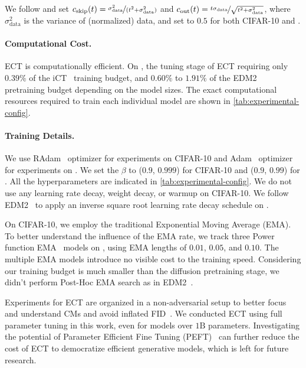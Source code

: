 We follow \citep{Karras2022edm,cm} and set $c_{\text{skip}}(t) = \nicefrac{\sigma_{\text{data}}^2}{(t^2 + \sigma_{\text{data}}^2)}$ and $c_{\text{out}}(t) = \nicefrac{t \sigma_{\text{data}}}{\sqrt{t^2 + \sigma_{\text{data}}^2}}$, where $\sigma_{\text{data}}^2$ is the variance of (normalized) data, and set to $0.5$ for both CIFAR-10 and \imgnet.  

\paragraph{Computational Cost.} ECT is computationally efficient. On \imgnet, the tuning stage of ECT requiring only $0.39\%$ of the iCT~\citep{ict} training budget, and $0.60\%$ to $1.91\%$ of the EDM2~\citep{Karras2024edm2} pretraining budget depending on the model sizes. 
The exact computational resources required to train each individual model are shown in \cref{tab:experimental-config}.



\paragraph{Training Details.} 
We use RAdam~\citep{radam} optimizer for experiments on CIFAR-10 and Adam~\citep{adam} optimizer for experiments on \imgnet. 
We set the $\beta$ to ($0.9$, $0.999$) for CIFAR-10 and ($0.9$, $0.99$) for \imgnet. All the hyperparameters are indicated in \cref{tab:experimental-config}.
We do not use any learning rate decay, weight decay, or warmup on CIFAR-10. We follow EDM2~\citep{Karras2024edm2} to apply an inverse square root learning rate decay schedule on \imgnet.

On CIFAR-10, we employ the traditional Exponential Moving Average (EMA). To better understand the influence of the EMA rate, we track three Power function EMA~\citep{Karras2024edm2} models on \imgnet, using EMA lengths of $0.01$, $0.05$, and $0.10$. The multiple EMA models introduce no visible cost to the training speed. Considering our training budget is much smaller than the diffusion pretraining stage, we didn't perform Post-Hoc EMA search as in EDM2~\citep{Karras2024edm2}.

Experiments for ECT are organized in a non-adversarial setup to better focus and understand CMs and avoid inflated FID~\citep{fd_dino}.
%
We conducted ECT using full parameter tuning in this work, even for models over $1\mathrm{B}$ parameters. 
Investigating the potential of Parameter Efficient Fine Tuning (PEFT)~\citep{hu2021lora} can further reduce the cost of ECT to democratize efficient generative models, which is left for future research.

